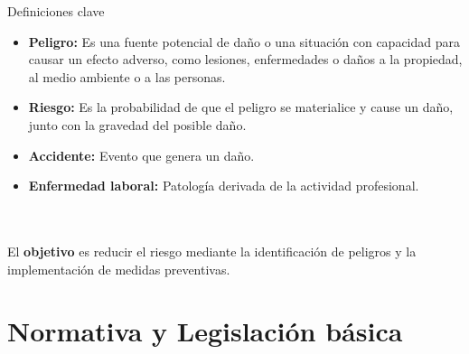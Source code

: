 \documentclass{beamer}
\begin{document}
\begin{frame}{Definiciones clave}
    \begin{itemize}
        \item \textbf{Peligro:} Es una fuente potencial de daño o una situación con capacidad para causar un efecto adverso, como lesiones, enfermedades o daños a la propiedad, al medio ambiente o a las personas.
        \item \textbf{Riesgo:} Es la probabilidad de que el peligro se materialice y cause un daño, junto con la gravedad del posible daño.
        \item \textbf{Accidente:} Evento que genera un daño.
        \item \textbf{Enfermedad laboral:} Patología derivada de la actividad profesional.
    \end{itemize}
    \\
    \vspace{1cm}
    \\
    El \textbf{objetivo} es reducir el riesgo mediante la identificación de peligros y la implementación de medidas preventivas.
\end{frame}



\section{Normativa y Legislación básica}
\end{document}
